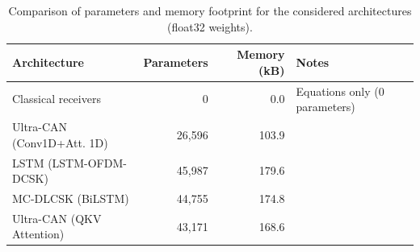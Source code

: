 \begin{table}[t]
\centering
\caption{Comparison of parameters and memory footprint for the considered architectures (float32 weights).}
\label{tab:weight_comparison}
\begin{tabular}{l r r l}
\toprule
\textbf{Architecture} & \textbf{Parameters} & \textbf{Memory (kB)} & \textbf{Notes} \\
\midrule
Classical receivers & 0 & 0.0 & Equations only (0 parameters) \\
Ultra-CAN (Conv1D+Att. 1D) & 26,596 & 103.9 &  \\
LSTM (LSTM-OFDM-DCSK) & 45,987 & 179.6 &  \\
MC-DLCSK (BiLSTM) & 44,755 & 174.8 &  \\
Ultra-CAN (QKV Attention) & 43,171 & 168.6 &  \\
\bottomrule
\end{tabular}
\end{table}